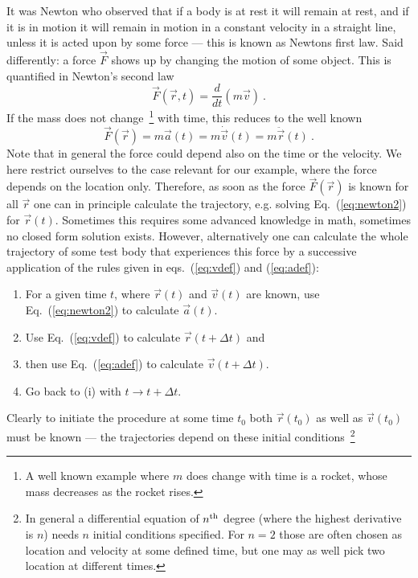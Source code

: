\documentclass[12pt, UK english]{iopart}
\begin{document}
It was Newton who observed that if a body is at rest it will remain at rest, and if it is in motion it will remain in motion in a constant velocity in a straight line, unless it is acted upon by some force --- this is known as Newtons first law.
Said differently: a force $\vec F$ shows up by changing the motion of some object.
This is quantified in Newton's second law
\begin{equation}
\vec F(\vec r, t) = \frac{d}{dt}(m \vec v) \ .
\end{equation} 
If the mass does not change~\footnote{%
	A well known example where $m$ does change with time is a rocket, whose mass decreases as the rocket rises.
} with time, this reduces to the well known
\begin{equation}
\vec F(\vec r) = m \vec a(t) = m\dot{\vec v}(t) = m\ddot{\vec{r}}(t) \ . \label{eq:newton2}
\end{equation} 
Note that in general the force could depend also on the time or the velocity.
We here restrict ourselves to the case relevant for our example, where the force depends on the location only. 
Therefore, as soon as the force $\vec F(\vec r)$ is known for all $\vec r$ one can in principle calculate the trajectory, e.g. solving Eq.~(\ref{eq:newton2}) for $\vec r(t)$.
Sometimes this requires some advanced knowledge in math, sometimes no closed form solution exists.
However, alternatively one can calculate the whole trajectory of some test body that experiences this force by a successive application of the rules given in eqs.~(\ref{eq:vdef}) and (\ref{eq:adef}):
\begin{enumerate}
\item For a given time $t$, where $\vec r(t)$ and $\vec v(t)$ are known, use Eq.~(\ref{eq:newton2}) to calculate $\vec a(t)$.
\item Use Eq.~(\ref{eq:vdef}) to calculate $\vec r(t+\Delta t)$ and
\item then use Eq.~(\ref{eq:adef}) to calculate $\vec v(t+\Delta t)$.
\item Go back to (i) with $t\to t+\Delta t$.
\end{enumerate}
Clearly to initiate the procedure at some time $t_0$ both $\vec r(t_0)$ as well as $\vec v(t_0)$ must be known --- the  trajectories depend on these initial conditions~\footnote{%
	In general a differential equation of $n^{\rm th}$ degree (where the highest derivative is $n$) needs $n$ initial conditions specified.
	For $n=2$ those are often chosen as location and velocity at some defined time, but one may as well pick two location at different times.%
}
\end{document}
